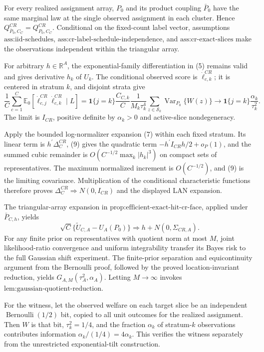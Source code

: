 For every realized assignment array, \(P_0\) and its product coupling \(\bar P_0\) have the same marginal law at the single observed assignment in each cluster.  Hence \(Q^{CR}_{\bar P_0,C_C}=Q^{CR}_{P_0,C_C}\).  Conditional on the fixed-count label vector, assumptions \(\text{ass:iid-schedules}\), \(\text{ass:cr-label-schedule-independence}\), and \(\text{ass:cr-exact-slices}\) make the observations independent within the triangular array.

For arbitrary \(h\in\mathbb R^A\), the exponential-family differentiation in (5) remains valid and gives derivative \(h_k\) of \(U_k\).  The conditional observed score is \(\dot\ell_{c,k}^{CR}\); it is centered in stratum \(k\), and disjoint strata give
\[
\frac1C\sum_{c=1}^C
\mathbb E_0[\dot\ell_{c,j}^{CR}\dot\ell_{c,k}^{CR}\mid L]
=\mathbf 1\{j=k\}\frac{C_{C,k}}{C}\frac1{M_k\tau_k^4}
\sum_{z\in\mathcal S_k}\operatorname{Var}_{P_0}\{W(z)\}
\longrightarrow\mathbf 1\{j=k\}\frac{\alpha_k}{\tau_k^2}. \tag{9}
\]
The limit is \(I_{CR}\), positive definite by \(\alpha_k>0\) and active-slice nondegeneracy.

Apply the bounded log-normalizer expansion (7) within each fixed stratum.  Its linear term is \(h^{\prime}\Delta_C^{CR}\), (9) gives the quadratic term \(-h^{\prime}I_{CR}h/2+o_P(1)\), and the summed cubic remainder is \(O(C^{-1/2}\max_k|h_k|^3)\) on compact sets of representatives.  The maximum normalized increment is \(O(C^{-1/2})\), and (9) is the limiting covariance.  Multiplication of the conditional characteristic functions therefore proves \(\Delta_C^{CR}\Rightarrow N(0,I_{CR})\) and the displayed LAN expansion.

The triangular-array expansion in \(\text{prop:efficient-exact-hit-cr-face}\), applied under \(\bar P_{C,h}\), yields
\[
\sqrt C\{\widetilde U_{C,A}-U_A(P_0)\}\Rightarrow
h+N(0,\Sigma_{CR,A}). \tag{10}
\]
For any finite prior on representatives with quotient norm at most \(M\), joint likelihood-ratio convergence and uniform integrability transfer its Bayes risk to the full Gaussian shift experiment.  The finite-prior separation and equicontinuity argument from the Bernoulli proof, followed by the proved location-invariant reduction, yields \(G_{A,M}(\tau_A^2,\alpha_A)\).  Letting \(M\to\infty\) invokes \(\text{lem:gaussian-quotient-reduction}\).

For the witness, let the observed welfare on each target slice be an independent \(\operatorname{Bernoulli}(1/2)\) bit, copied to all unit outcomes for the realized assignment.  Then \(W\) is that bit, \(\tau_k^2=1/4\), and the fraction \(\alpha_k\) of stratum-\(k\) observations contributes information \(\alpha_k/(1/4)=4\alpha_k\).  This verifies the witness separately from the unrestricted exponential-tilt construction.